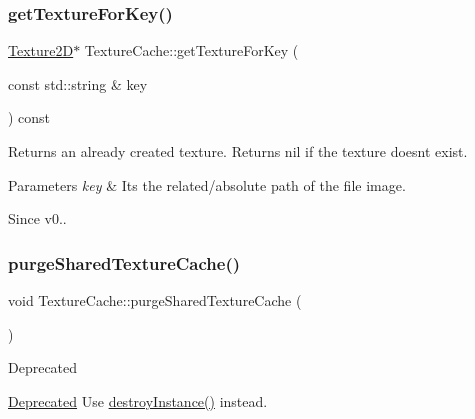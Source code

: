 \subsubsection{\texorpdfstring{get\+Texture\+For\+Key()}{getTextureForKey()}\hspace{0.1cm}{\footnotesize\ttfamily [2/2]}}
{\footnotesize\ttfamily \hyperlink{classTexture2D}{Texture2D}$\ast$ Texture\+Cache\+::get\+Texture\+For\+Key (\begin{DoxyParamCaption}\item[{const std\+::string \&}]{key }\end{DoxyParamCaption}) const}

Returns an already created texture. Returns nil if the texture doesn\textquotesingle{}t exist. 
\begin{DoxyParams}{Parameters}
{\em key} & It\textquotesingle{}s the related/absolute path of the file image. \\
\hline
\end{DoxyParams}
\begin{DoxySince}{Since}
v0.. 
\end{DoxySince}
\mbox{\label{classTextureCache_a61daeb91b7d2cd8228fd4849384108c1}} 
\subsubsection{\texorpdfstring{purge\+Shared\+Texture\+Cache()}{purgeSharedTextureCache()}\hspace{0.1cm}{\footnotesize\ttfamily [1/2]}}
{\footnotesize\ttfamily void Texture\+Cache\+::purge\+Shared\+Texture\+Cache (\begin{DoxyParamCaption}{ }\end{DoxyParamCaption})\hspace{0.3cm}{\ttfamily [static]}}

\begin{DoxyRefDesc}{Deprecated}
\item[\hyperlink{deprecated__deprecated000136}{Deprecated}]Use \hyperlink{classTextureCache_a39aaf943d5c4969590a5f0c2f2008d68}{destroy\+Instance()} instead. \end{DoxyRefDesc}
\mbox{\label{classTextureCache_ab45bcaee3f6fd43a4d1dc29ff9107b4e}} 
